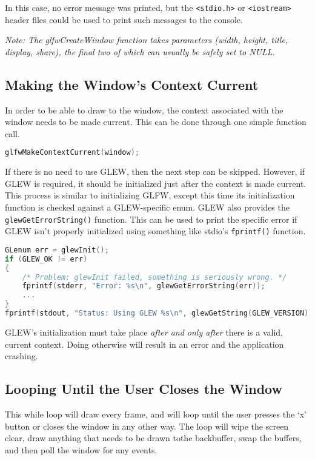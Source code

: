 \documentclass{article}
\newcommand{\ilcode}[1]{{\footnotesize\texttt{#1}}}
\begin{document}
In this case, no error message was printed, but the \ilcode{<stdio.h>} or \ilcode{<iostream>} header files could be used to print such messages to the console. 

\textit{Note: The glfwCreateWindow function takes parameters (width, height, title, display, share), the final two of which can usually be safely set to NULL.}

\subsection{Making the Window's Context Current}

In order to be able to draw to the window, the context associated with the window needs to be made current. This can be done through one simple function call.

\begin{lstlisting}[language=C++]
glfwMakeContextCurrent(window);
\end{lstlisting}

If there is no need to use GLEW, then the next step can be skipped. However, if GLEW is required, it should be initialized just after the context is made current. This process is similar to initializing GLFW, except this time its initialization function is checked against a GLEW-specific enum. GLEW also provides the \ilcode{glewGetErrorString()} function. This can be used to print the specific error if GLEW isn't properly initialized using something like stdio's \ilcode{fprintf()} function.

\break

\begin{lstlisting}[language=C++]
GLenum err = glewInit();
if (GLEW_OK != err)
{
    /* Problem: glewInit failed, something is seriously wrong. */
    fprintf(stderr, "Error: %s\n", glewGetErrorString(err));
    ...
}
fprintf(stdout, "Status: Using GLEW %s\n", glewGetString(GLEW_VERSION));
\end{lstlisting}

GLEW's initialization must take place \emph{after and only after} there is a valid, current context. Doing otherwise will result in an error and the application crashing.

\subsection{Looping Until the User Closes the Window}

This while loop will draw every frame, and will loop until the user presses the `x' button or closes the window in any other way. The loop will wipe the screen clear, draw anything that needs to be drawn tothe backbuffer, swap the buffers, and then poll the window for any events.
\end{document}
